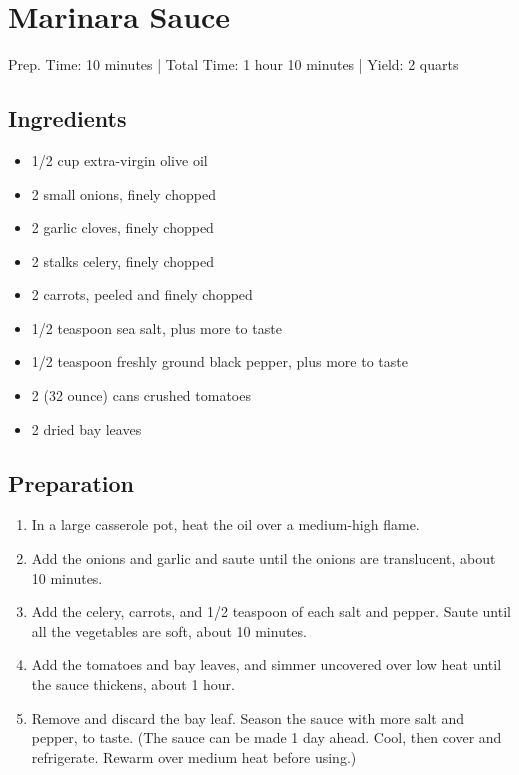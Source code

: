 \section{Marinara Sauce}

\noindent Prep. Time: 10 minutes |
Total Time: 1 hour 10 minutes | 
Yield: 2 quarts

\subsection{Ingredients}
\begin{itemize}
    \item 1/2 cup extra-virgin olive oil
    \item 2 small onions, finely chopped
    \item 2 garlic cloves, finely chopped
    \item 2 stalks celery, finely chopped
    \item 2 carrots, peeled and finely chopped
    \item 1/2 teaspoon sea salt, plus more to taste
    \item 1/2 teaspoon freshly ground black pepper, plus more to taste
    \item 2 (32 ounce) cans crushed tomatoes
    \item 2 dried bay leaves
\end{itemize}

\subsection{Preparation}
\begin{enumerate}
    \item In a large casserole pot, heat the oil over a medium-high flame.
    \item Add the onions and garlic and saute until the onions are translucent, about 10 minutes. 
    \item Add the celery, carrots, and 1/2 teaspoon of each salt and pepper. Saute until all the vegetables are soft, about 10 minutes. 
    \item Add the tomatoes and bay leaves, and simmer uncovered over low heat until the sauce thickens, about 1 hour.
    \item Remove and discard the bay leaf. Season the sauce with more salt and pepper, to taste. (The sauce can be made 1 day ahead. Cool, then cover and refrigerate. Rewarm over medium heat before using.)
\end{enumerate}
